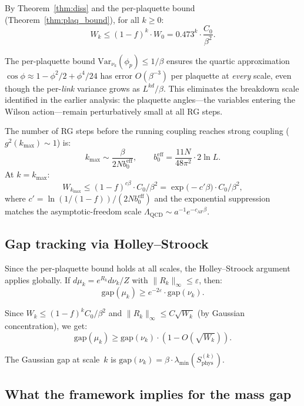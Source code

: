 \documentclass[11pt]{article}
\theoremstyle{definition}
\newcommand{\Var}{\mathrm{Var}}
\newcommand{\gap}{\mathrm{gap}}
\begin{document}
By Theorem~\ref{thm:diss} and the per-plaquette bound 
(Theorem~\ref{thm:plaq_bound}), for all $k \geq 0$:
\[
  W_k \leq (1 - f)^k \cdot W_0 = 0.473^k \cdot \frac{C_0}{\beta^2}.
\]

The per-plaquette bound $\Var_{\nu_k}(\phi_p) \leq 1/\beta$ ensures the 
quartic approximation $\cos\phi \approx 1 - \phi^2/2 + \phi^4/24$ has 
error $O(\beta^{-3})$ per plaquette at \emph{every} scale, even though 
the per-\emph{link} variance grows as $L^{kd}/\beta$.  This eliminates 
the breakdown scale identified in the earlier analysis: the plaquette 
angles---the variables entering the Wilson action---remain perturbatively 
small at all RG steps.

The number of RG steps before the running coupling reaches strong 
coupling ($g^2(k_{\max}) \sim 1$) is:
\[
  k_{\max} \sim \frac{\beta}{2N b_0^{\mathrm{eff}}}, \qquad 
  b_0^{\mathrm{eff}} = \frac{11N}{48\pi^2} \cdot 2\ln L.
\]
At $k = k_{\max}$:
\begin{equation}\label{eq:W_kmax}
  W_{k_{\max}} \leq (1-f)^{c \beta} \cdot C_0/\beta^2 
  = \exp\bigl(-c' \beta\bigr) \cdot C_0/\beta^2,
\end{equation}
where $c' = \ln(1/(1-f))/(2N b_0^{\mathrm{eff}})$ and the exponential 
suppression matches the asymptotic-freedom scale 
$\Lambda_{\mathrm{QCD}} \sim a^{-1} e^{-c_{\mathrm{AF}}\beta}$.

\subsection{Gap tracking via Holley--Stroock}

Since the per-plaquette bound holds at all scales, the 
Holley--Stroock argument applies globally.
If $d\mu_k = e^{R_k} d\nu_k / Z$ with 
$\|R_k\|_\infty \leq \varepsilon$, then:
\[
  \gap(\mu_k) \geq e^{-2\varepsilon} \cdot \gap(\nu_k).
\]

Since $W_k \leq (1-f)^k C_0/\beta^2$ and 
$\|R_k\|_\infty \leq C\sqrt{W_k}$ (by Gaussian concentration), we get:
\[
  \gap(\mu_k) \geq \gap(\nu_k) \cdot (1 - O(\sqrt{W_k})).
\]

The Gaussian gap at scale~$k$ is 
$\gap(\nu_k) = \beta \cdot \lambda_{\min}(S^{(k)}_{\mathrm{phys}})$.

\subsection{What the framework implies for the mass gap}\label{sec:continuum}
\end{document}
